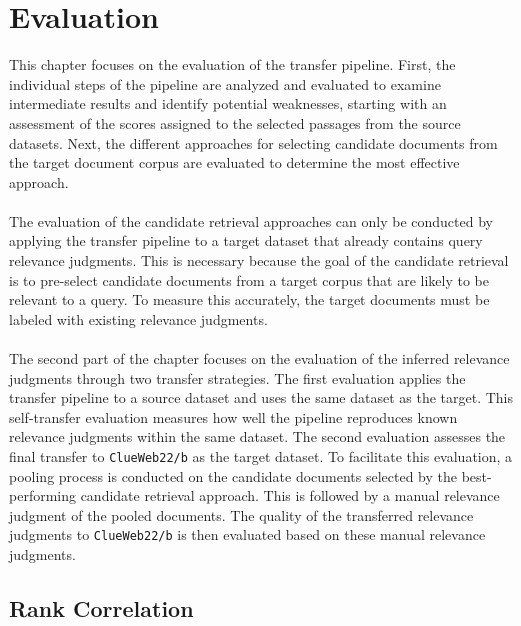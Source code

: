 \chapter{Evaluation}\label{evaluation}

This chapter focuses on the evaluation of the transfer pipeline. First, the individual steps of the pipeline are analyzed and evaluated to examine intermediate results and identify potential weaknesses, starting with an assessment of the scores assigned to the selected passages from the source datasets. Next, the different approaches for selecting candidate documents from the target document corpus are evaluated to determine the most effective approach.
\\\\
The evaluation of the candidate retrieval approaches can only be conducted by applying the transfer pipeline to a target dataset that already contains query relevance judgments. This is necessary because the goal of the candidate retrieval is to pre-select candidate documents from a target corpus that are likely to be relevant to a query. To measure this accurately, the target documents must be labeled with existing relevance judgments.
\\\\
The second part of the chapter focuses on the evaluation of the inferred relevance judgments through two transfer strategies. The first evaluation applies the transfer pipeline to a source dataset and uses the same dataset as the target. This self-transfer evaluation measures how well the pipeline reproduces known relevance judgments within the same dataset. The second evaluation assesses the final transfer to \texttt{ClueWeb22/b} as the target dataset. To facilitate this evaluation, a pooling process is conducted on the candidate documents selected by the best-performing candidate retrieval approach. This is followed by a manual relevance judgment of the pooled documents. The quality of the transferred relevance judgments to \texttt{ClueWeb22/b} is then evaluated based on these manual relevance judgments.
\section{Rank Correlation}\label{rank-correlation}

